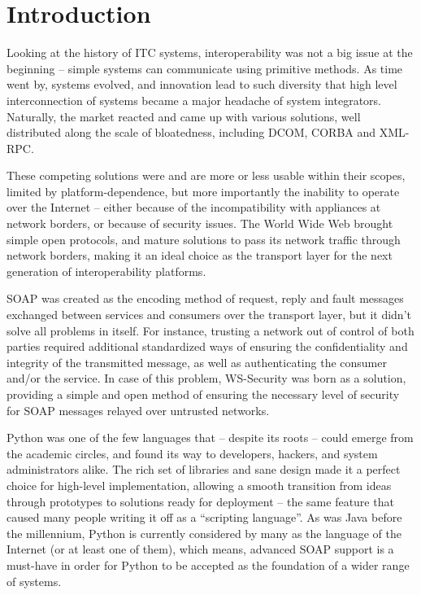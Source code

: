 
\chapter*{Introduction}


Looking at the history of ITC systems, interoperability was not a big issue at the beginning -- simple systems can communicate using primitive methods. As time went by, systems evolved, and innovation lead to such diversity that high level interconnection of systems became a major headache of system integrators. Naturally, the market reacted and came up with various solutions, well distributed along the scale of bloatedness, including DCOM, CORBA and XML-RPC.

These competing solutions were and are more or less usable within their scopes, limited by platform-dependence, but more importantly the inability to operate over the Internet -- either because of the incompatibility with appliances at network borders, or because of security issues. The World Wide Web brought simple open protocols, and mature solutions to pass its network traffic through network borders, making it an ideal choice as the transport layer for the next generation of interoperability platforms.

SOAP was created as the encoding method of request, reply and fault messages exchanged between services and consumers over the transport layer, but it didn't solve all problems in itself. For instance, trusting a network out of control of both parties required additional standardized ways of ensuring the confidentiality and integrity of the transmitted message, as well as authenticating the consumer and/or the service. In case of this problem, WS\hyp{}Security was born as a solution, providing a simple and open method of ensuring the necessary level of security for SOAP messages relayed over untrusted networks.

Python was one of the few languages that -- despite its roots -- could emerge from the academic circles, and found its way to developers, hackers, and system administrators alike. The rich set of libraries and sane design made it a perfect choice for high-level implementation, allowing a smooth transition from ideas through prototypes to solutions ready for deployment -- the same feature that caused many people writing it off as a ``scripting language''. As was Java before the millennium, Python is currently considered by many as the language of the Internet (or at least one of them), which means, advanced SOAP support is a must-have in order for Python to be accepted as the foundation of a wider range of systems.


